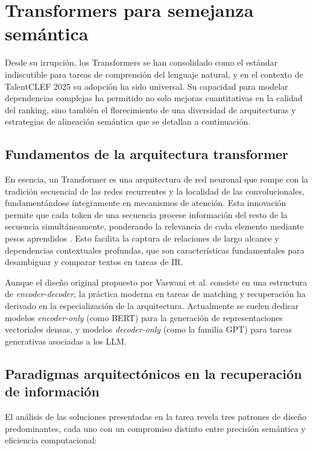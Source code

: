 \section{Transformers para semejanza semántica}
\label{sec:Transformers}


\noindent Desde su irrupción, los Transformers se han consolidado como el estándar indiscutible para tareas de comprensión del lenguaje natural, y en el contexto de TalentCLEF 2025 su adopción ha sido universal. Su capacidad para modelar dependencias complejas ha permitido no solo mejoras cuantitativas en la calidad del ranking, sino también el florecimiento de una diversidad de arquitecturas y estrategias de alineación semántica que se detallan a continuación.

\subsection{Fundamentos de la arquitectura transformer}

\noindent En esencia, un Transformer es una arquitectura de red neuronal que rompe con la tradición secuencial de las redes recurrentes y la localidad de las convolucionales, fundamentándose íntegramente en mecanismos de atención. Esta innovación permite que cada token de una secuencia procese información del resto de la secuencia simultáneamente, ponderando la relevancia de cada elemento mediante pesos aprendidos \cite{vaswani2017attention}. Esto facilita la captura de relaciones de largo alcance y dependencias contextuales profundas, que son características fundamentales para desambiguar y comparar textos en tareas de \gls{IR}.

Aunque el diseño original propuesto por Vaswani et al. consiste en una estructura de \textit{encoder-decoder}, la práctica moderna en tareas de matching y recuperación ha derivado en la especialización de la arquitectura. Actualmente se suelen dedicar modelos \textit{encoder-only} (como BERT) para la generación de representaciones vectoriales densas, y modelos \textit{decoder-only} (como la familia GPT) para tareas generativas asociadas a los \gls{LLM}.

\subsection{Paradigmas arquitectónicos en la recuperación de información}

\noindent El análisis de las soluciones presentadas en la tarea revela tres patrones de diseño predominantes, cada uno con un compromiso distinto entre precisión semántica y eficiencia computacional:

